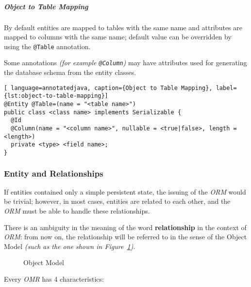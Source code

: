 \documentclass[english]{article}
\begin{document}
\subparagraph*{Object to Table Mapping}
By default entities are mapped to tables with the same name and attributes are mapped to columns with the same name;
default value can be overridden by using the \texttt{@Table} annotation.

Some annotations \textit{(for example \texttt{@Column})} may have attributes used for generating the database schema from the entity classes.

\begin{lstlisting}[ language=annotatedjava, caption={Object to Table Mapping}, label={lst:object-to-table-mapping}]
@Entity @Table=(name = "<table name>")
public class <class name> implements Serializable {
  @Id
  @Column(name = "<column name>", nullable = <true|false>, length = <length>)
  private <type> <field name>;
}
\end{lstlisting}

\subsubsection{Entity and Relationships}

If entities contained only a simple persistent state, the issuing of the \textit{ORM} would be trivial;
however, in most cases, entities are related to each other, and the \textit{ORM} must be able to handle these relationships.

There is an ambiguity in the meaning of the word \textbf{relationship} in the context of \textit{ORM}:
from now on, the relationship will be referred to in the sense of the Object Model \textit{(such as the one shown in Figure~\ref{fig:object-model})}.

\begin{figure}[htbp]
  \centering
  \bigskip
  \bigskip
  \caption{Object Model}
  \label{fig:object-model}
\end{figure}

Every \textit{OMR} has 4 characteristics:
\end{document}
